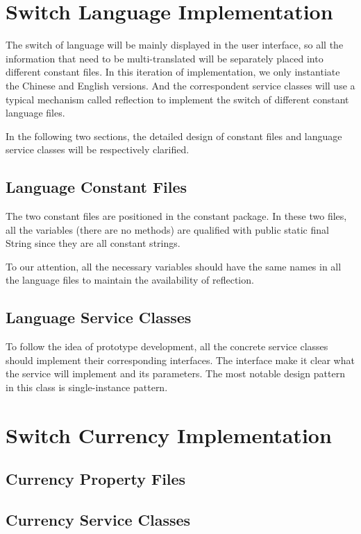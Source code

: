 \documentclass[a4paper]{report}
\begin{document}
\section{Switch Language Implementation}
\par The switch of language will be mainly displayed in the user interface, so all the information that need to be multi-translated will be separately placed into  different constant files. In this iteration of implementation, we only instantiate the Chinese and English versions. And the correspondent service classes will use a typical mechanism called reflection to implement the switch of different constant language files.
\par In the following two sections, the detailed design of constant files and language service classes will be respectively clarified.
\subsection{Language Constant Files}
\par The two constant files are positioned in the constant package. In these two files, all the variables (there are no methods) are qualified with public static final String since they are all constant strings.
\par To our attention, all the necessary variables should have the same names in all the language files to maintain the availability of reflection.
\subsection{Language Service Classes }
\par To follow the idea of prototype development, all the concrete service classes should implement their corresponding interfaces. The interface make it clear what the service will implement and its parameters. The most notable design pattern in this class is single-instance pattern.

\section{Switch Currency Implementation}
\subsection{Currency Property Files}
\subsection{Currency Service Classes}
\end{document}
